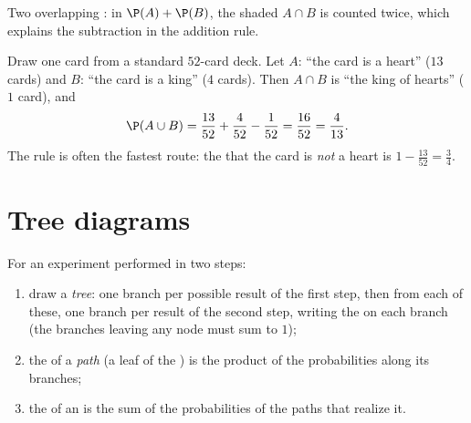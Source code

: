 \begin{omfigure}

{\small Two overlapping : in $\P(A) + \P(B)$, the shaded
 $A \cap B$ is counted twice, which explains the subtraction
in the addition rule.}
\end{omfigure}

\begin{example}\label{ex:g10:proba:cards}
Draw one card from a standard $52$-card deck. Let $A$: ``the card is a
heart'' ($13$ cards) and $B$: ``the card is a king'' ($4$ cards). Then
$A \cap B$ is ``the king of hearts'' ($1$ card), and
\[
\P(A \cup B) = \frac{13}{52} + \frac{4}{52} - \frac{1}{52} = \frac{16}{52}
= \frac{4}{13}.
\]
The  rule is often the fastest route: the  that the
card is \emph{not} a heart is $1 - \frac{13}{52} = \frac34$.
\end{example}

\section{Tree diagrams}

\begin{method}\label{met:g10:proba:tree}
For an experiment performed in two steps:
\begin{enumerate}
  \item draw a \emph{tree}: one branch per possible
        result of the first step, then from each of these, one branch per
        result of the second step, writing the  on each branch
        (the branches leaving any node must sum to $1$);
  \item the  of a \emph{path} (a leaf of the ) is the
        product of the probabilities along its branches;
  \item the  of an  is the sum of the probabilities of
        the paths that realize it.
\end{enumerate}
\end{method}

